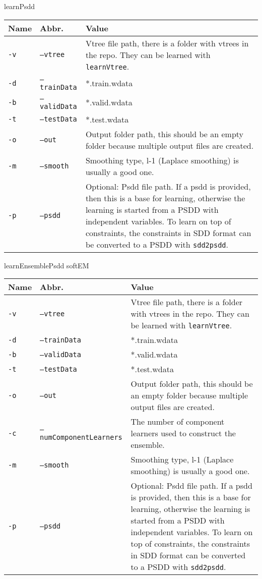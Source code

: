 \documentclass[a4paper,10pt]{article}
\begin{document}
learnPsdd
\begin{center}
 \begin{tabular}{l|l|p{7cm}}
  Name	& Abbr. &Value \\\hline\hline
{\tt-v}	& {\tt --vtree}		& Vtree file path, there is a folder with vtrees in the repo. They can be learned with {\tt learnVtree}. \\\hline
{\tt-d}	& {\tt --trainData}	& *.train.wdata\\\hline
{\tt-b}	& {\tt --validData}	& *.valid.wdata\\\hline
{\tt-t}	& {\tt --testData}	& *.test.wdata\\\hline
{\tt-o}	& {\tt --out}		& Output folder path, this should be an empty folder because multiple output files are created.\\\hline
{\tt-m}	& {\tt --smooth}	& Smoothing type, l-1 (Laplace smoothing) is usually a good one.\\\hline
{\tt-p}	& {\tt --psdd}		& Optional: Psdd file path. If a psdd is provided, then this is a base for learning, otherwise the learning is started from a PSDD with independent variables. To learn on top of constraints, the constraints in SDD format can be converted to a PSDD with {\tt sdd2psdd}.\\
 \end{tabular}
 \end{center}
 
 \clearpage
 learnEnsemblePsdd softEM
\begin{center}
 \begin{tabular}{l|l|p{7cm}}
  Name	& Abbr. &Value \\\hline\hline
{\tt-v}	& {\tt --vtree}		& Vtree file path, there is a folder with vtrees in the repo. They can be learned with {\tt learnVtree}. \\\hline
{\tt-d}	& {\tt --trainData}	& *.train.wdata\\\hline
{\tt-b}	& {\tt --validData}	& *.valid.wdata\\\hline
{\tt-t}	& {\tt --testData}	& *.test.wdata\\\hline
{\tt-o}	& {\tt --out}		& Output folder path, this should be an empty folder because multiple output files are created.\\\hline
{\tt-c} & {\tt --numComponentLearners} & The number of component learners used to construct the ensemble. \\\hline
{\tt-m}	& {\tt --smooth}	& Smoothing type, l-1 (Laplace smoothing) is usually a good one.\\\hline
{\tt-p}	& {\tt --psdd}		& Optional: Psdd file path. If a psdd is provided, then this is a base for learning, otherwise the learning is started from a PSDD with independent variables. To learn on top of constraints, the constraints in SDD format can be converted to a PSDD with {\tt sdd2psdd}.\\
 \end{tabular}

\end{center}
\end{document}

